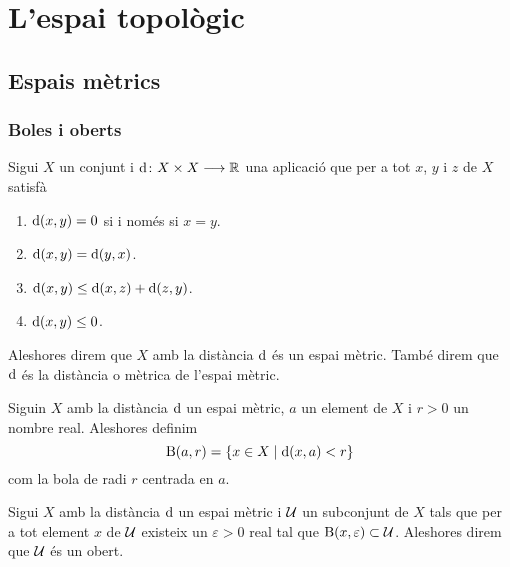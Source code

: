 \documentclass[../Apunts.tex]{subfiles}
\begin{document}
\chapter{L'espai topològic}
	\section{Espais mètrics}
	\subsection{Boles i oberts}
	\begin{definition}
		\label{def:espai mètric}
		\label{def:distància}
		Sigui \(X\) un conjunt i \(\operatorname{d}\colon X\times X\longrightarrow\mathbb{R}\) una aplicació que per a tot \(x\), \(y\) i \(z\) de \(X\) satisfà
		\begin{enumerate}
			\item \(\operatorname{d}(x,y)=0\) si i només si \(x=y\).
			\item \(\operatorname{d}(x,y)=\operatorname{d}(y,x)\).
			\item \(\operatorname{d}(x,y)\leq\operatorname{d}(x,z)+\operatorname{d}(z,y)\).
			\item \(\operatorname{d}(x,y)\leq0\).
		\end{enumerate}
		Aleshores direm que \(X\) amb la distància \(\operatorname{d}\) és un espai mètric. També direm que \(\operatorname{d}\) és la distància o mètrica de l'espai mètric.
	\end{definition}
	\begin{definition}[Bola]
		\label{def:bola}
		Siguin \(X\) amb la distància \(\operatorname{d}\) un espai mètric, \(a\) un element de \(X\) i \(r>0\) un nombre real. Aleshores definim
		\[\operatorname{B}(a,r)=\{x\in X\mid\operatorname{d}(x,a)<r\}\]
		com la bola de radi \(r\) centrada en \(a\).
	\end{definition}
	\begin{definition}[Obert]
		\label{def:obert espai mètric}
		Sigui \(X\) amb la distància \(\operatorname{d}\) un espai mètric i \(\mathcal{U}\) un subconjunt de \(X\) tals que per a tot element \(x\) de \(\mathcal{U}\) existeix un \(\varepsilon>0\) real tal que \(\operatorname{B}(x,\varepsilon)\subset\mathcal{U}\). Aleshores direm que \(\mathcal{U}\) és un obert.
	\end{definition}
\end{document}
